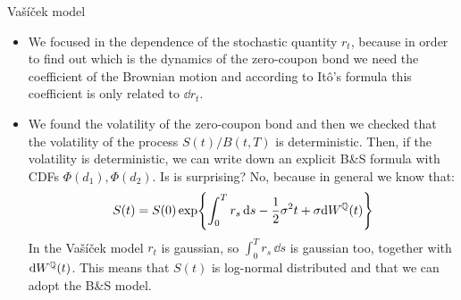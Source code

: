 \begin{example}{Vašíček model}{}{}
\begin{itemize}
        \item We focused in the dependence of the stochastic quantity $r_t$, because in order to find out which is the dynamics of the zero-coupon bond we need the coefficient of the Brownian motion and according to Itô's formula this coefficient is only related to $\dd r_t$.
        \item We found the volatility of the zero-coupon bond and then we checked that the volatility of the process $S(t)/B(t,T)$ is deterministic. Then, if the volatility is deterministic, we can write down an explicit B\&S formula with CDFs $\Phi(d_1),\Phi(d_2)$. Is is surprising? No, because in general we know that:
        \begin{equation*}
            S(t) = S(0)\exp{\int_0^T r_s\,\dd s - \frac{1}{2}\sigma^2 t + \sigma\dd W^{\mathbb{Q}}(t)}
        \end{equation*}
        In the Vašíček model $r_t$ is gaussian, so $\int_0^T r_s\,\dd s$ is gaussian too, together with $\dd W^{\mathbb{Q}}(t)$. This means that $S(t)$ is log-normal distributed and that we can adopt the B\&S model.
    \end{itemize}
\end{example}
